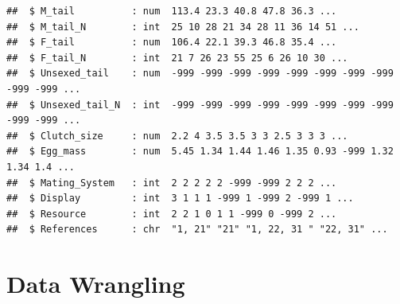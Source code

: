 \documentclass[
  12pt,
]{article}
\begin{document}
\begin{verbatim}
##  $ M_tail          : num  113.4 23.3 40.8 47.8 36.3 ...
##  $ M_tail_N        : int  25 10 28 21 34 28 11 36 14 51 ...
##  $ F_tail          : num  106.4 22.1 39.3 46.8 35.4 ...
##  $ F_tail_N        : int  21 7 26 23 55 25 6 26 10 30 ...
##  $ Unsexed_tail    : num  -999 -999 -999 -999 -999 -999 -999 -999 -999 -999 ...
##  $ Unsexed_tail_N  : int  -999 -999 -999 -999 -999 -999 -999 -999 -999 -999 ...
##  $ Clutch_size     : num  2.2 4 3.5 3.5 3 3 2.5 3 3 3 ...
##  $ Egg_mass        : num  5.45 1.34 1.44 1.46 1.35 0.93 -999 1.32 1.34 1.4 ...
##  $ Mating_System   : int  2 2 2 2 2 -999 -999 2 2 2 ...
##  $ Display         : int  3 1 1 1 -999 1 -999 2 -999 1 ...
##  $ Resource        : int  2 2 1 0 1 1 -999 0 -999 2 ...
##  $ References      : chr  "1, 21" "21" "1, 22, 31 " "22, 31" ...
\end{verbatim}

\newpage

\hypertarget{data-wrangling}{%
\section{Data Wrangling}\label{data-wrangling}}
\end{document}
